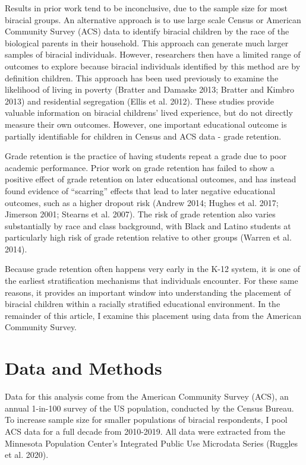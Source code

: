 \documentclass[
  letterpaper,
  DIV=11,
  numbers=noendperiod]{scrartcl}
\begin{document}
Results in prior work tend to be inconclusive, due to the sample size
for most biracial groups. An alternative approach is to use large scale
Census or American Community Survey (ACS) data to identify biracial
children by the race of the biological parents in their household. This
approach can generate much larger samples of biracial individuals.
However, researchers then have a limited range of outcomes to explore
because biracial individuals identified by this method are by definition
children. This approach has been used previously to examine the
likelihood of living in poverty (Bratter and Damaske 2013; Bratter and
Kimbro 2013) and residential segregation (Ellis et al. 2012). These
studies provide valuable information on biracial childrens' lived
experience, but do not directly measure their own outcomes. However, one
important educational outcome is partially identifiable for children in
Census and ACS data - grade retention.

Grade retention is the practice of having students repeat a grade due to
poor academic performance. Prior work on grade retention has failed to
show a positive effect of grade retention on later educational outcomes,
and has instead found evidence of ``scarring'' effects that lead to
later negative educational outcomes, such as a higher dropout risk
(Andrew 2014; Hughes et al. 2017; Jimerson 2001; Stearns et al. 2007).
The risk of grade retention also varies substantially by race and class
background, with Black and Latino students at particularly high risk of
grade retention relative to other groups (Warren et al. 2014).

Because grade retention often happens very early in the K-12 system, it
is one of the earliest stratification mechanisms that individuals
encounter. For these same reasons, it provides an important window into
understanding the placement of biracial children within a racially
stratified educational environment. In the remainder of this article, I
examine this placement using data from the American Community Survey.

\hypertarget{data-and-methods}{%
\section{Data and Methods}\label{data-and-methods}}

Data for this analysis come from the American Community Survey (ACS), an
annual 1-in-100 survey of the US population, conducted by the Census
Bureau. To increase sample size for smaller populations of biracial
respondents, I pool ACS data for a full decade from 2010-2019. All data
were extracted from the Minnesota Population Center's Integrated Public
Use Microdata Series (Ruggles et al. 2020).
\end{document}
